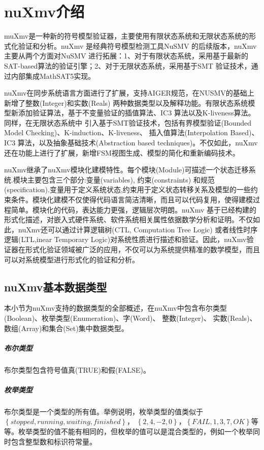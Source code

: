 \chapter{nuXmv介绍}
muXmv是一种新的符号模型验证器，主要使用有限状态系统和无限状态系统的形式化验证和分析。nuXmv 是经典符号模型检测工具NuSMV 的后续版本，nuXmv 主要从两个方面对NuSMV 进行拓展：1、对于有限状态系统，采用基于最新的SAT-based算法的验证引擎；2、对于无限状态系统，采用基于SMT 验证技术，通过内部集成MathSAT5实现。

nuXmv在同步系统语言方面进行了扩展，支持AIGER规范，在NUSMV的基础上新增了整数(Integer)和实数(Reals) 两种数据类型以及解释功能。有限状态系统模型新添加验证算法，基于不变量验证的插值算法、IC3 算法以及K-liveness算法。同样，在无限状态系统中
引入基于SMT验证技术，包括有界模型验证(Bounded Model Checking)、K-induction、K-liveness、 插入值算法(Interpolation Based)、IC3 算法，以及抽象基础技术(Abstraction based techniques)。不仅如此，nuXmv 还在功能上进行了扩展，新增FSM视图生成、模型的简化和重新编码技术。

nuXmv继承了nuXmv模块化建模特性。每个模块(Module)可描述一个状态迁移系统.模块主要包含三个部分:变量(variables), 约束(constraints) 和规范(specification).变量用于定义系统状态,约束用于定义状态转移关系及模型的一些约束条件。模块化建模不仅使得代码语言简洁清晰，而且可以代码复用，使得建模过程简单。模块化的代码，表达能力更强，逻辑层次明朗。nuXmv 基于已经构建的形式化描述，对嵌入式硬件系统、软件系统相关属性依据数学分析和证明。不仅如此，nuXmv还可以通过计算逻辑树(CTL, Computation Tree Logic) 或者线性时序逻辑(LTL,inear Temporary Logic)对系统性质进行描述和验证。因此，nuXmv验证器在形式化验证领域被广泛的应用，不仅可以为系统提供精准的数学模型，而且可以对系统模型进行形式化的验证和分析。

\section{nuXmv基本数据类型}
本小节为nuXmv支持的数据类型的全部概述，在nuXmv中包含布尔类型(Boolean)、枚举类型(Enumeration)、字(Word)、 整数(Integer)、 实数(Reals)、数组(Array)和集合(Set)集中数据类型。

\paragraph{布尔类型}
布尔类型包含符号值真(TRUE)和假(FALSE)。

\paragraph{枚举类型}
布尔类型是一个类型的所有值。举例说明，枚举类型的值类似于$\left\{stopped,running,waiting,finished\right\}$，
$\left\{2, 4, -2, 0\right\}$，$\left\{FAIL, 1, 3, 7, OK\right\}$等等。枚举类型的值不能有相同的，但枚举的值可以是混合类型的，例如一个枚举同时包含整型数和标识符常量。

